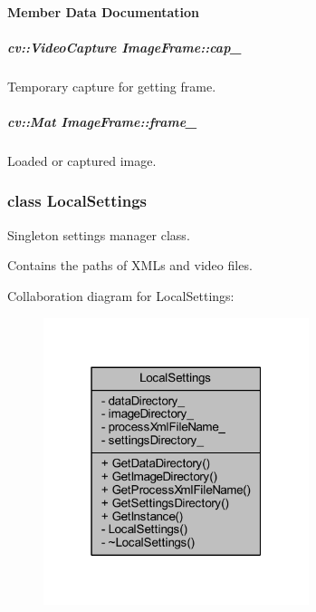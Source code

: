 \paragraph{Member Data Documentation}
\hypertarget{group___core_a1f8ba0c6c7f724a41f5f5fef19bfe035}{
\subparagraph[{cap\-\_\-}]{\setlength{\rightskip}{0pt plus 5cm}cv\-::\-Video\-Capture Image\-Frame\-::cap\-\_\-\hspace{0.3cm}{\ttfamily [private]}}}\label{group___core_a1f8ba0c6c7f724a41f5f5fef19bfe035}


Temporary capture for getting frame. 

\hypertarget{group___core_a6aaede1e96c67711280696df991b4508}{
\subparagraph[{frame\-\_\-}]{\setlength{\rightskip}{0pt plus 5cm}cv\-::\-Mat Image\-Frame\-::frame\-\_\-\hspace{0.3cm}{\ttfamily [private]}}}\label{group___core_a6aaede1e96c67711280696df991b4508}


Loaded or captured image. 

\label{class_local_settings}
\hypertarget{group___core_class_local_settings}{}
\subsubsection{class Local\-Settings}
Singleton settings manager class. 

Contains the paths of X\-M\-Ls and video files. 

Collaboration diagram for Local\-Settings\-:
\nopagebreak
\begin{figure}[H]
\begin{center}
\leavevmode
\includegraphics[width=220pt]{class_local_settings__coll__graph}
\end{center}
\end{figure}

